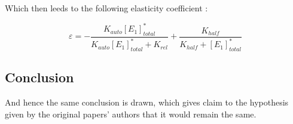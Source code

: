 \noindent Which then leeds to the following elasticity coefficient :

\begin{equation*}
    \varepsilon = -\frac{K_{auto}[E_1]^*_{total}}{K_{auto}[E_1]^*_{total} + K_{rel}} + \frac{K_{half}}{K_{half} + [E_1]^*_{total}}
\end{equation*}

\subsection*{Conclusion}
And hence the same conclusion is drawn, which gives claim to 
the hypothesis given by the original papers' authors that it 
would remain the same.
